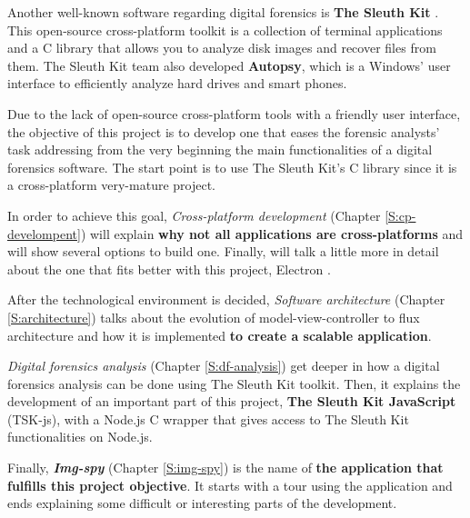 Another well-known software regarding digital forensics is \textbf{The Sleuth
Kit} \cite{tsk-web}. This open-source cross-platform toolkit is a collection 
of terminal applications and a C library that allows you to analyze disk images
and recover files from them. The Sleuth Kit team also developed
\textbf{Autopsy}, which is a Windows' user interface to efficiently analyze
hard drives and smart phones.

Due to the lack of open-source cross-platform tools with a friendly user
interface, the objective of this project is to develop one that eases the
forensic analysts' task addressing from the very beginning the main
functionalities of a digital forensics software. The start point is to use The
Sleuth Kit's C library  \cite{tsk-web} since it is a cross-platform very-mature
project.

In order to achieve this goal, \textit{Cross-platform development} (Chapter
\ref{S:cp-develompent}) will explain \textbf{why not all applications are
cross-platforms} and will show several options to build one. Finally, will talk
a little more in detail about the one that fits better with this project,
Electron \cite{electron-web}.

After the technological environment is decided, \textit{Software architecture}
(Chapter \ref{S:architecture}) talks about the evolution of 
model-view-controller to flux architecture and how it is implemented \textbf{to 
create a scalable application}.

\textit{Digital forensics analysis} (Chapter \ref{S:df-analysis}) get deeper in
how a digital forensics analysis can be done using The Sleuth Kit toolkit. Then,
it explains the development of an important part of this project, \textbf{The
Sleuth Kit JavaScript} (TSK-js), with a Node.js \cite{nodejs-web} C wrapper
that gives access to The Sleuth Kit functionalities on Node.js.

Finally, \textbf{\textit{Img-spy}} (Chapter \ref{S:img-spy}) is the name of
\textbf{the application that fulfills this project objective}. It starts with a
tour using the application and ends explaining some difficult or interesting
parts of the development.

